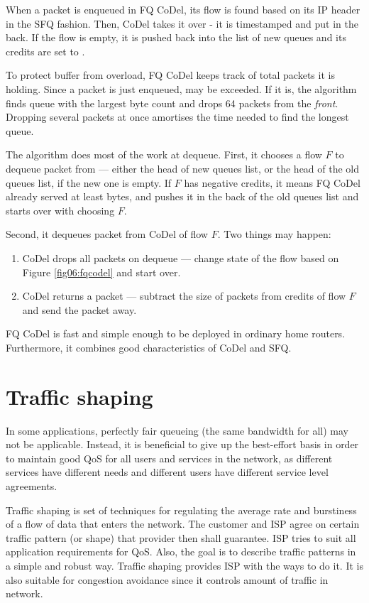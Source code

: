 When a packet is enqueued in FQ CoDel, its flow is found based on its IP header in the SFQ fashion. Then, CoDel takes it over - it is timestamped and put in the back. If the flow is empty, it is pushed back into the list of new queues and its credits are set to .

To protect buffer from overload, FQ CoDel keeps track of total packets it is holding. Since a packet is just enqueued,  may be exceeded. If it is, the algorithm finds queue with the largest byte count and drops 64 packets from the \textit{front}. Dropping several packets at once amortises the time needed to find the longest queue.

The algorithm does most of the work at dequeue. First, it chooses a flow $F$ to dequeue packet from --- either the head of new queues list, or the head of the old queues list, if the new one is empty. If $F$ has negative credits, it means FQ CoDel already served at least  bytes, and pushes it in the back of the old queues list and starts over with choosing $F$.

Second, it dequeues packet from CoDel of flow $F$. Two things may happen:
\begin{enumerate}
	\item CoDel drops all packets on dequeue --- change state of the flow based on Figure \ref{fig06:fqcodel} and start over.
	\item CoDel returns a packet --- subtract the size of packets from credits of flow $F$ and send the packet away.
\end{enumerate}

FQ CoDel is fast and simple enough to be deployed in ordinary home routers. Furthermore, it combines good characteristics of CoDel and SFQ.

\section{Traffic shaping}

In some applications, perfectly fair queueing (the same bandwidth for all) may not be applicable. Instead, it is beneficial to give up the best-effort basis in order to maintain good QoS for all users and services in the network, as different services have different needs and different users have different service level agreements. 

Traffic shaping is set of techniques for regulating the average rate and burstiness of a flow of data that enters the network. The customer and ISP agree on certain traffic pattern (or shape) that provider then shall guarantee. ISP tries to suit all application requirements for QoS. Also, the goal is to describe traffic patterns in a simple and robust way. Traffic shaping provides ISP with the ways to do it. It is also suitable for congestion avoidance since it controls amount of traffic in network.

